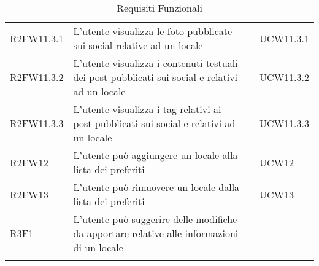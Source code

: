 \begin{longtable}{ m{}<{\centering}  m{}<{\centering}  m{}<{\centering}  m{}<{\centering}}
	R2FW11.3.1 & L’utente visualizza le foto pubblicate sui social relative ad un locale & \De & UCW11.3.1 \\
	R2FW11.3.2 & L’utente visualizza i contenuti testuali dei post pubblicati sui social e relativi ad un locale & \De & UCW11.3.2 \\
	R2FW11.3.3 & L’utente visualizza i tag relativi ai post pubblicati sui social e relativi ad un locale & \De & UCW11.3.3 \\ 	 	 	

	R2FW12 & L’utente può aggiungere un locale alla lista dei preferiti & \De &  UCW12\\ 	 	 	

	R2FW13 & L’utente può rimuovere un locale dalla lista dei preferiti & \De & UCW13\\

	R3F1 & L’utente può suggerire delle modifiche da apportare relative alle informazioni di un locale & \Fa & \Di \\

	\hiderowcolors \caption{Requisiti Funzionali}
\end{longtable}

\clearpage